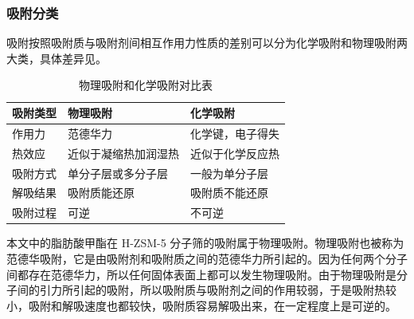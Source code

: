 \subsubsection{吸附分类}
\par{吸附按照吸附质与吸附剂间相互作用力性质的差别可以分为化学吸附和物理吸附两大类，具体差异见。}
\begin{table}[htbp]
	\small
	\centering
	\caption{物理吸附和化学吸附对比表}
    \begin{tabular}{p{3cm}<{\centering}p{4cm}<{\centering}p{4cm}<{\centering}}
        \toprule
        吸附类型&物理吸附&化学吸附\\
        \midrule
        作用力&	范德华力	&化学键，电子得失\\
热效应	&近似于凝缩热加润湿热	&近似于化学反应热\\
吸附方式	&单分子层或多分子层	&一般为单分子层\\
解吸结果	&吸附质能还原	&吸附质不能还原\\
吸附过程	&可逆&	不可逆\\
		\bottomrule
	\end{tabular}
	\label{xifu}
\end{table}
\par{本文中的脂肪酸甲酯在 H-ZSM-5 分子筛的吸附属于物理吸附。物理吸附也被称为范德华吸附，它是由吸附剂和吸附质之间的范德华力所引起的。因为任何两个分子间都存在范德华力，所以任何固体表面上都可以发生物理吸附。由于物理吸附是分子间的引力所引起的吸附，所以吸附质与吸附剂之间的作用较弱，于是吸附热较小，吸附和解吸速度也都较快，吸附质容易解吸出来，在一定程度上是可逆的。}
